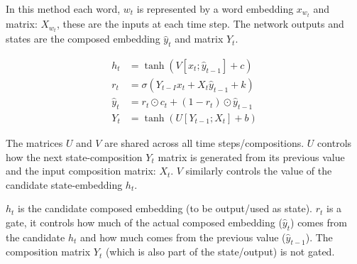 \documentclass[12pt,parskip]{komatufte}
\begin{document}
In this method each word, $w_t$ is represented by a word embedding $x_{w_t}$ and matrix: $X_{w_t}$, these are the inputs at each time step.
The network outputs and states are the composed embedding $\hat{y}_t$ and matrix $Y_t$.

 
\begin{align}
h_t &= \tanh\left(V[x_t; \hat{y}_{t-1}] + c \right)\\
r_t &= \sigma\left(Y_{t-I}x_t + X_t \hat{y}_{t-1} + k \right)\\
%
\hat{y}_t &= r_t \odot c_t + (1-r_t) \odot \hat{y}_{t-1} \\
Y_t &= \tanh \left( U[Y_{t-1}; X_t] + b \right)
\end{align}



The matrices $U$ and $V$ are shared across all time steps/compositions.
$U$ controls how the next state-composition $Y_t$ matrix is generated from its previous value and the input composition matrix: $X_t$.
$V$ similarly controls the value of the candidate state-embedding $h_t$.

$h_t$ is the candidate composed embedding (to be output/used as state).
$r_t$ is a gate, it controls how much of the actual composed embedding ($\hat{y}_t$) comes from the candidate $h_t$ and how much comes from the previous value ($\hat{y}_{t-1}$).
The composition matrix $Y_t$ (which is also part of the state/output) is not gated.
\end{document}
